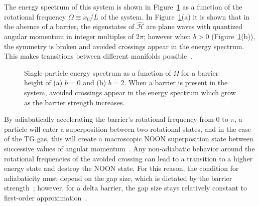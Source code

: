 The energy spectrum of this system is shown in Figure~\ref{fig:avoid} as a function of the rotational frequency $\Omega \equiv \dot x_0 /L$ of the system.
In Figure~\ref{fig:avoid}(a) it is shown that in the absence of a barrier, the eigenstates of $\mathcal{\hat H}$ are plane waves with quantized angular momentum in integer multiples of $2 \pi$; however when $b>0$ (Figure~\ref{fig:avoid}(b)), the symmetry is broken and avoided crossings appear in the energy spectrum.
This makes transitions between different manifolds possible~\cite{schenke2012}.

\begin{figure}

 \centering

\caption{Single-particle energy spectrum as a function of $\Omega$ for a barrier height of (a) $b = 0$ and (b) $b=2$.
When a barrier is present in the system, avoided crossings appear in the energy spectrum which grow as the barrier strength increases.}
\label{fig:avoid}
\end{figure}

By adiabatically accelerating the barrier's rotational frequency from 0 to $\pi$, a particle will enter a superposition between two rotational states, and in the case of the TG gas, this will create a macroscopic NOON superposition state between successive values of angular momentum~\cite{hallwood2010}.
Any non-adiabatic behavior around the rotational frequencies of the avoided crossing can lead to a transition to a higher energy state and destroy the NOON state.
For this reason, the condition for adiabaticity must depend on the gap size, which is dictated by the barrier strength~\cite{nunnenkamp2008}; however, for a delta barrier, the gap size stays relatively constant to first-order approximation~\cite{hallwood2007}.

